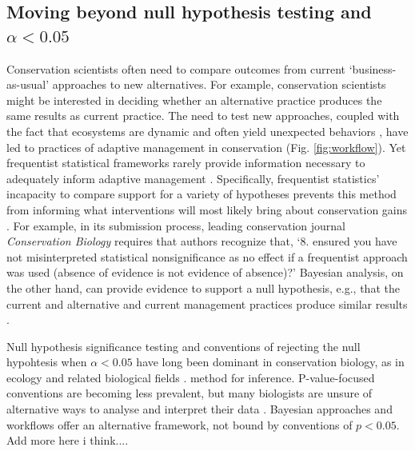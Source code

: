 \documentclass{article}
\begin{document}
\subsection*{Moving beyond null hypothesis testing and $\alpha <0.05$ }
\par Conservation scientists often need to compare outcomes from current `business-as-usual' approaches to new alternatives. For example, conservation scientists might be interested in deciding whether an alternative practice produces the same results as current practice. 
The need to test new approaches, coupled with the fact that ecosystems are dynamic and often yield unexpected behaviors \citep{Levin2012,Gross2013}, have led to practices of adaptive management in conservation \citep{holling1978adaptive} (Fig. \ref{fig:workflow}). Yet frequentist statistical frameworks rarely provide information necessary to adequately inform adaptive management \citep{prato2005bayesian}.  Specifically, frequentist statistics' incapacity to compare support for a variety of hypotheses \citep[including a `null' hypothesis;][]{Zyl2018} prevents this method from informing what interventions will most likely bring about conservation gains \citep{prato2005bayesian}. For example, in its submission process, leading conservation journal \textit{Conservation Biology} requires that authors recognize that, `8. ensured you have not misinterpreted statistical nonsignificance as no effect if a frequentist approach was used (absence of evidence is not evidence of absence)?' Bayesian analysis, on the other hand, can provide evidence to support a null hypothesis, e.g., that the current and alternative and current management practices produce similar results \citep{gallistel2009importance}.
\par Null hypothesis significance testing and conventions of rejecting the null hypohtesis when $\alpha <0.05$ have long been dominant in conservation biology, as in ecology and related biological fields \citep[e.g., ecotoxicaology][]{erickson2020moving}. method for inference. P-value-focused conventions are becoming less prevalent, but many biologists are unsure of alternative ways to analyse and interpret their data \citep{halsey2019reign}. Bayesian approaches and workflows offer an alternative framework, not bound by conventions of $p<0.05$. Add more here i think....
\end{document}
